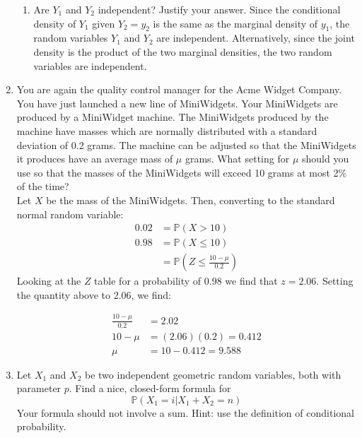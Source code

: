 \documentclass[12pt]{article}
\def\P{{\mathbb P}}
\begin{document}
\begin{enumerate}
\begin{enumerate}
\item Are $Y_1$ and $Y_2$ independent? Justify your answer.
Since the conditional density of $Y_1$ given $Y_2 = y_2$ is the same as the marginal density of $y_1$, the random variables $Y_1$ and $Y_2$ are independent. Alternatively, since the joint density is the product of the two marginal densities, the two random variables are independent.
\end{enumerate}

\item You are again the quality control manager for the Acme Widget Company. You have just launched a new line of MiniWidgets. Your MiniWidgets are produced by a MiniWidget machine. The MiniWidgets produced by the machine have masses which are normally distributed with a standard deviation of 0.2 grams. The machine can be adjusted so that the MiniWidgets it produces have an average mass of $\mu$ grams. What setting for $\mu$ should you use so that the masses of the MiniWidgets will exceed 10 grams at most 2\% of the time?\\

Let $X$ be the mass of the MiniWidgets. Then, converting to the standard normal random variable:
\begin{align*}
0.02 &= \P(X > 10) \\
0.98 &= \P(X \leq 10)\\
&= \P\left( Z \leq \frac{10 - \mu}{0.2} \right)
\end{align*}
Looking at the $Z$ table for a probability of 0.98 we find that $z = 2.06$. Setting the quantity above to 2.06, we find:

\begin{align*}
\frac{10 - \mu}{0.2} &= 2.02 \\
10 - \mu &= (2.06)(0.2) = 0.412 \\
\mu &= 10 - 0.412 = 9.588
\end{align*}


\item Let $X_1$ and $X_2$ be two independent geometric random variables, both with parameter $p$. Find a nice, closed-form formula for
\[
\P(X_1 = i | X_1 + X_2 = n)
\]
Your formula should not involve a sum. Hint: use the definition of conditional probability.\\


\end{enumerate}
\end{document}
